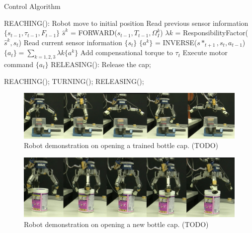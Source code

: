 \begin{algorithm}
  \caption{Control Algorithm}
  \begin{algorithmic}[1]
    \State REACHING(): Robot move to initial position\;
          \State Read previous sensor information $\{s_{t-1},\tau_{t-1},F_{t-1}\}$\;
            \State $\hat{s}^{k}$ = FORWARD($s_{t-1},T_{t-1},\Omega_I^k$) \;
          \EndFor
            \State $\lambda{k}$ = ResponsibilityFactor($\hat{s}^{k},s_t$) \;
          \EndFor
          \State Read current sensor information $\{s_{t}\}$\;
            \State $\{a^k\}$ = INVERSE($s*_{t+1},s_t,a_{t-1}$) \;
          \EndFor
          \State $\{a_t\} = \sum_{k=1,2,3}\lambda{k}\{a^k\}$\;\;
          \State Add compensational torque to $\tau_t$\;
          \State Execute motor command $\{a_t\}$ \;
          \State RELEASING(): Release the cap;
        \EndFunction
    \EndFor

        \State REACHING();
        \State TURNING();
        \State RELEASING();
    \EndWhile

  \end{algorithmic}
  \label{code:control}
\end{algorithm}





\begin{figure}
  \centering
  \includegraphics[width=15cm]{./fig/demo_train.jpg}
  \caption{ \scriptsize{Robot demonstration on opening a trained bottle cap. (TODO)}
}
\label{fig:demo_train}
\end{figure}

\begin{figure}
  \centering
  \includegraphics[width=15cm]{./fig/demo_new.jpg}
  \caption{ \scriptsize{Robot demonstration on opening a new bottle cap. (TODO)}
}
\label{fig:demo_new}
\end{figure}

